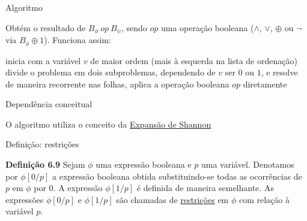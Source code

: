 \expandafter\documentclass\expandafter[table, usenames, svgnames, dvipsnames,14pt, \classopts]{beamer}
\begin{document}
\begin{frame}{Algoritmo }

    \small
    Obtém o resultado de $B_\phi~op~B_\psi$, sendo $op$ uma operação booleana ($\land$, $\lor$, $\oplus$ ou $\lnot$ via $B_\phi \oplus 1$). Funciona assim:

    \begin{outline}[enumerate]
        \1 inicia com a variável $v$ de maior ordem (mais à esquerda na lista de ordenação)
        \1 divide o problema em dois subproblemas, dependendo de $v$ ser $0$ ou $1$, e resolve de maneira recorrente
        \1 nas folhas, aplica a operação booleana $op$ diretamente
    \end{outline}

\end{frame}

\begin{frame}{Dependência conceitual}

    \centering
    O algoritmo  utiliza o conceito da \underline{Expansão de Shannon}
    
\end{frame}

\begin{frame}{Definição: restrições}

    \begin{block}{\textbf{Definição 6.9}}
        Sejam $\phi$ uma expressão booleana e $p$ uma variável. Denotamos por $\phi[0/p]$ a expressão booleana obtida substituindo-se todas as ocorrências de $p$ em $\phi$ por $0$. A expressão $\phi[1/p]$ é definida de maneira semelhante. As expressões $\phi[0/p]$ e $\phi[1/p]$ são chamadas de \underline{restrições} em $\phi$ com relação à variável $p$.
    \end{block}

\end{frame}
\end{document}
